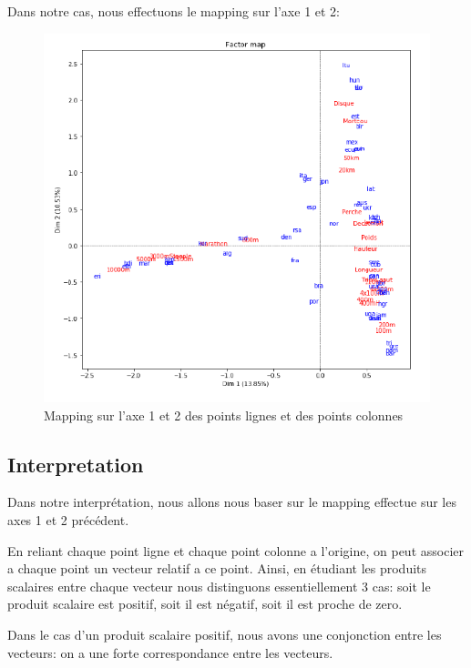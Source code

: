 \documentclass{article}
\begin{document}
\newpage

Dans notre cas, nous effectuons le mapping sur l'axe 1 et 2:

\begin{figure}[h!]
\centering
\includegraphics[scale=0.8]{images/Mapping.PNG}
\caption{Mapping sur l'axe 1 et 2 des points lignes et des points colonnes}
\end{figure}

\subsection{Interpretation}

Dans notre interprétation, nous allons nous baser sur le mapping effectue sur les axes 1 et 2 précédent.
\newline

En reliant chaque point ligne et chaque point colonne a l'origine, on peut associer a chaque point un vecteur relatif a ce point. Ainsi, en étudiant les produits scalaires entre chaque vecteur nous distinguons essentiellement 3 cas: soit le produit scalaire est positif, soit il est négatif, soit il est proche de zero.
\newline

Dans le cas d'un produit scalaire positif, nous avons une conjonction entre les vecteurs: on a une forte correspondance entre les vecteurs.
\newline
\end{document}
